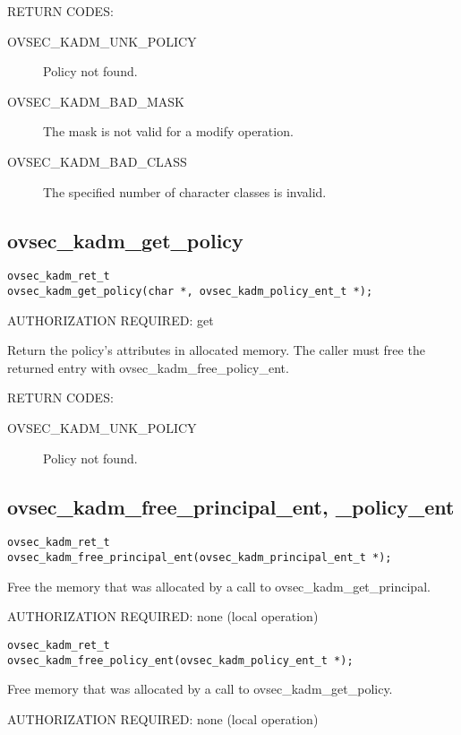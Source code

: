 RETURN CODES: 

\begin{description}
\item[OVSEC_KADM_UNK_POLICY] Policy not found.
\item[OVSEC_KADM_BAD_MASK] The mask is not valid for a modify
operation.
\item[OVSEC_KADM_BAD_CLASS] The specified number of character classes
is invalid.
\end{description}

\subsection{ovsec_kadm_get_policy}

\begin{verbatim}
ovsec_kadm_ret_t
ovsec_kadm_get_policy(char *, ovsec_kadm_policy_ent_t *); 
\end{verbatim}

AUTHORIZATION REQUIRED: get

Return the policy's attributes in allocated memory.  The caller must
free the returned entry with ovsec_kadm_free_policy_ent.

RETURN CODES: 

\begin{description}
\item[OVSEC_KADM_UNK_POLICY] Policy not found.
\end{description}

\subsection{ovsec_kadm_free_principal_ent, _policy_ent}

\begin{verbatim}
ovsec_kadm_ret_t
ovsec_kadm_free_principal_ent(ovsec_kadm_principal_ent_t *);
\end{verbatim}

Free the memory that was allocated by a call to
ovsec_kadm_get_principal. 

AUTHORIZATION REQUIRED: none (local operation)

\begin{verbatim}
ovsec_kadm_ret_t
ovsec_kadm_free_policy_ent(ovsec_kadm_policy_ent_t *);
\end{verbatim}

Free memory that was allocated by a call to ovsec_kadm_get_policy.

AUTHORIZATION REQUIRED: none (local operation)

